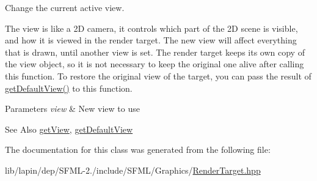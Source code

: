 Change the current active view. 

The view is like a 2\-D camera, it controls which part of the 2\-D scene is visible, and how it is viewed in the render target. The new view will affect everything that is drawn, until another view is set. The render target keeps its own copy of the view object, so it is not necessary to keep the original one alive after calling this function. To restore the original view of the target, you can pass the result of \hyperlink{classsf_1_1_render_target_a718b1aa6296bf855171699cc18251ced}{get\-Default\-View()} to this function.


\begin{DoxyParams}{Parameters}
{\em view} & New view to use\\
\hline
\end{DoxyParams}
\begin{DoxySeeAlso}{See Also}
\hyperlink{classsf_1_1_render_target_a98f721cc6dc11478922427fedfb2288b}{get\-View}, \hyperlink{classsf_1_1_render_target_a718b1aa6296bf855171699cc18251ced}{get\-Default\-View} 
\end{DoxySeeAlso}


The documentation for this class was generated from the following file\-:\begin{DoxyCompactItemize}
\item 
lib/lapin/dep/\-S\-F\-M\-L-\/2./include/\-S\-F\-M\-L/\-Graphics/\hyperlink{lapin_2dep_2_s_f_m_l-2_83_2include_2_s_f_m_l_2_graphics_2_render_target_8hpp}{Render\-Target.\-hpp}\end{DoxyCompactItemize}

